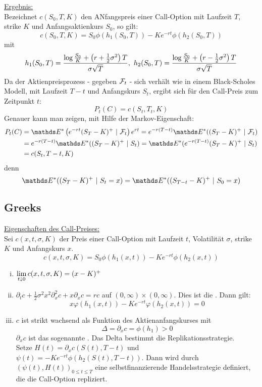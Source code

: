\uline{Ergebnis:}\\
Bezeichnet $c(S_0,T,K)$ den ANfangspreis einer Call-Option mit Laufzeit $T$, strike $K$ und Anfangsaktienkurs $S_0$, so gilt:
\[
c(S_0,T,K)= S_0\phi(h_1(S_0,T))-Ke^{-rt}\phi(h_2(S_0,T))
\]
mit 
\[
h_1(S_0,T)=\frac{\log\frac{S_0}{K}+\left( r+\frac{1}{2}\sigma^2\right)T}{\sigma\sqrt{T}},~h_2(S_0,T)=\frac{\log\frac{S_0}{K}+\left( r-\frac{1}{2}\sigma^2\right)T}{\sigma\sqrt{T}}
\]
Da der Aktienpreisprozess - gegeben $\mathcal{F}_t$ - sich verhält wie in einem Black-Scholes Modell, mit Laufzeit $T-t$ und Anfangskurs $S_t$, ergibt sich für den Call-Preis zum Zeitpunkt $t$:
\[
P_t(C)=c(S_t,T_t,K)
\]
Genauer kann man zeigen, mit Hilfe der Markov-Eigenschaft:
\begin{equation*}
\begin{aligned}
	P_t(C) &= \E^*\enbrace{e^{-rt}(S_T-K)^+~|~\F_t}e^{rt} = e^{-r(T-t)}\E^*((S_T-K)^+~|~\F_t)\\
	&= e^{-r(T-t)}\E^*((S_T-K)^+~|~S_t) = \E^*(e^{-r(T-t)}(S_T-K)^+~|~S_t)\\
	&= c(S_t,T-t,K)
\end{aligned}
\end{equation*}
denn
\[
\E^*((S_T-K)^+~|~S_t=x) = \E^*((S_{T-t}-K)^+~|~S_0=x)
\]

\subsection{Greeks}
\label{sub:greeks}
\uline{Eigenschaften des Call-Preises:}\\
Sei $c(x,t,\sigma,K)$ der Preis einer Call-Option mit Laufzeit $t$, Volatilität $\sigma$, strike $K$ und Anfangskurs $x$.
\[
c(x,t,\sigma,K)= S_0\phi(h_1(x,t))-Ke^{-rt}\phi(h_2(x,t))
\]
\begin{enumerate}[(i)]
	\item $\lim\ablim{t\downarrow 0}c(x,t,\sigma,K)=(x-K)^+$
	\item $\partial_tc+\frac{1}{2}\sigma^2x^2\partial_x^2c+x\partial_xc=rc$ auf $(0,\infty)\times(0,\infty)$.
	Dies ist die .
	Dann gilt:
	\[
	x\varphi(h_1(x,t))-Ke^{-rt}\varphi(h_2(x,t))=0
	\]
	\item $c$ ist strikt wachsend als Funktion des Aktienanfangskurses mit
	\[
	\Delta =\partial_xc=\phi(h_1)>0
	\]
	$\partial_xc$ ist das sogenannte .
	Das Delta bestimmt die Replikationsstrategie.\\
	Setze $H(t)=\partial_xc(S(t),T-t)$ und $\psi(t)=-Ke^{-rt}\phi(h_2(S(t),T-t))$.
	Dann wird durch $(\psi(t),H(t))_{0\le t\le T}$ eine selbstfinanzierende Handelsstrategie definiert, die die Call-Option repliziert.
\end{enumerate}





\cleardoubleoddemptypage
{}
\setcounter{page}{1}


\printindex
\listoffigures
